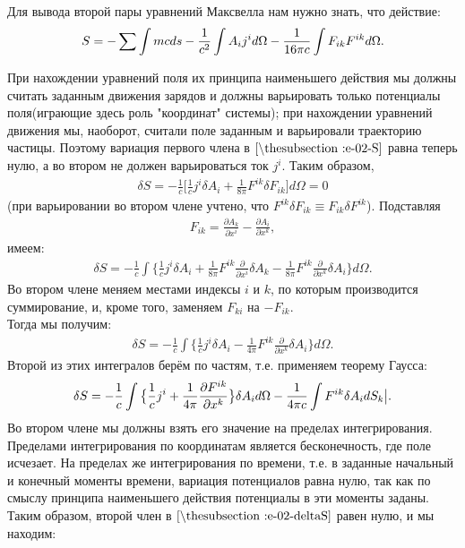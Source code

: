 \documentclass[__main__.tex]{subfiles}
\begin{document}
Для вывода второй пары уравнений Максвелла нам нужно знать, что действие:
\begin{gather}
    \llabel{e-02-S}
    S = -\sum\int mcds - \frac{1}{c^2}\int A_ij^id\Omega - \frac{1}{16\pi c}\int F_{ik}F^{ik}d\Omega.
\end{gather}

При нахождении уравнений поля их принципа наименьшего действия мы должны считать заданным движения зарядов и должны варьировать только потенциалы поля(играющие здесь роль "координат" системы); при нахождении уравнений движения мы, наоборот, считали поле заданным и варьировали траекторию частицы.
Поэтому вариация первого члена в $\lref{e-02-S}$ равна теперь нулю, а во втором не должен варьироваться ток $j^i$. Таким образом,
\begin{gather*}
    \delta S = -\frac{1}{c}\big[\frac{1}{c}j^i\delta A_i + \frac{1}{8\pi}F^{ik}\delta F_{ik}\big]d\Omega = 0
\end{gather*}
(при варьировании во втором члене учтено, что $F^{ik}\delta F_{ik} \equiv F_{ik}\delta F^{ik}$). Подставляя
\begin{gather*}
    F_{ik} = \frac{\partial A_k}{\partial x^i} - \frac{\partial A_i}{\partial x^k},
\end{gather*}
имеем:
\begin{gather*}
    \delta S = -\frac{1}{c}\int \big\{\frac{1}{c}j^i\delta A_i + \frac{1}{8\pi}F^{ik}\frac{\partial}{\partial x^i}\delta A_k - \frac{1}{8\pi}F^{ik}\frac{\partial}{\partial x^k}\delta A_i\big\}d\Omega.
\end{gather*}
Во втором члене меняем местами индексы $i$ и $k$, по которым производится суммирование, и, кроме того, заменяем $F_{ki}$ на $-F_{ik}$.\\
Тогда мы получим:
\begin{gather*}
    \delta S = -\frac{1}{c}\int\big\{\frac{1}{c}j^i\delta A_i - \frac{1}{4\pi}F^{ik}\frac{\partial}{\partial x^k}\delta A_i\big\}d\Omega.
\end{gather*}
Второй из этих интегралов берём по частям, т.е. применяем теорему Гаусса:
\begin{gather}
    \llabel{e-02-deltaS}
    \delta S = -\frac{1}{c}\int\big\{\frac{1}{c}j^i + \frac{1}{4\pi}\frac{\partial F^{ik}}{\partial x^k}\big\}\delta A_id\Omega - \frac{1}{4\pi c}\int F^{ik}\delta A_idS_k\big|.
\end{gather}
Во втором члене  мы должны взять его значение на пределах интегрирования. Пределами интегрирования по координатам является бесконечность, где поле исчезает. На пределах же интегрирования по времени, т.е. в заданные начальный и конечный моменты времени, вариация потенциалов равна нулю, так как по смыслу принципа наименьшего действия потенциалы в эти моменты заданы. Таким образом, второй член в $\lref{e-02-deltaS}$ равен нулю, и мы находим:
\end{document}
